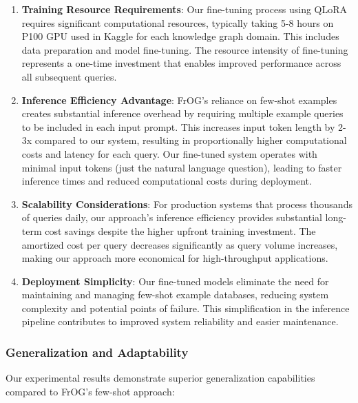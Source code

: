 \begin{enumerate}
    \item \textbf{Training Resource Requirements}: Our fine-tuning process using QLoRA requires significant computational resources, typically taking 5-8 hours on P100 GPU used in Kaggle for each knowledge graph domain. This includes data preparation and model fine-tuning. The resource intensity of fine-tuning represents a one-time investment that enables improved performance across all subsequent queries.
    
    \item \textbf{Inference Efficiency Advantage}: FrOG's reliance on few-shot examples creates substantial inference overhead by requiring multiple example queries to be included in each input prompt. This increases input token length by 2-3x compared to our system, resulting in proportionally higher computational costs and latency for each query. Our fine-tuned system operates with minimal input tokens (just the natural language question), leading to faster inference times and reduced computational costs during deployment.
    
    \item \textbf{Scalability Considerations}: For production systems that process thousands of queries daily, our approach's inference efficiency provides substantial long-term cost savings despite the higher upfront training investment. The amortized cost per query decreases significantly as query volume increases, making our approach more economical for high-throughput applications.
    
    \item \textbf{Deployment Simplicity}: Our fine-tuned models eliminate the need for maintaining and managing few-shot example databases, reducing system complexity and potential points of failure. This simplification in the inference pipeline contributes to improved system reliability and easier maintenance.
\end{enumerate}

\subsubsection{Generalization and Adaptability}
Our experimental results demonstrate superior generalization capabilities compared to FrOG's few-shot approach:

